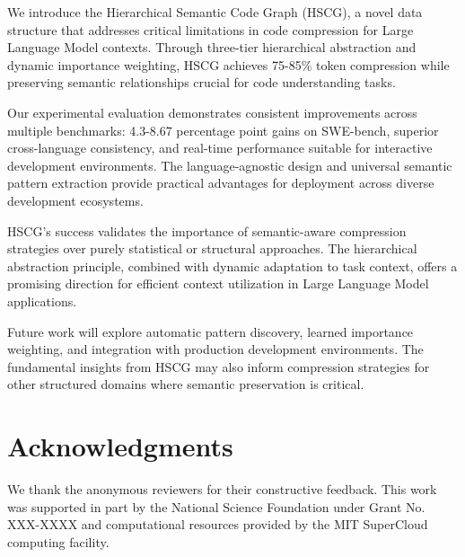 \documentclass[conference]{IEEEtran}
\begin{document}
We introduce the Hierarchical Semantic Code Graph (HSCG), a novel data structure that addresses critical limitations in code compression for Large Language Model contexts. Through three-tier hierarchical abstraction and dynamic importance weighting, HSCG achieves 75-85\% token compression while preserving semantic relationships crucial for code understanding tasks.

Our experimental evaluation demonstrates consistent improvements across multiple benchmarks: 4.3-8.67 percentage point gains on SWE-bench, superior cross-language consistency, and real-time performance suitable for interactive development environments. The language-agnostic design and universal semantic pattern extraction provide practical advantages for deployment across diverse development ecosystems.

HSCG's success validates the importance of semantic-aware compression strategies over purely statistical or structural approaches. The hierarchical abstraction principle, combined with dynamic adaptation to task context, offers a promising direction for efficient context utilization in Large Language Model applications.

Future work will explore automatic pattern discovery, learned importance weighting, and integration with production development environments. The fundamental insights from HSCG may also inform compression strategies for other structured domains where semantic preservation is critical.

\section*{Acknowledgments}

We thank the anonymous reviewers for their constructive feedback. This work was supported in part by the National Science Foundation under Grant No. XXX-XXXX and computational resources provided by the MIT SuperCloud computing facility.




\end{document}
